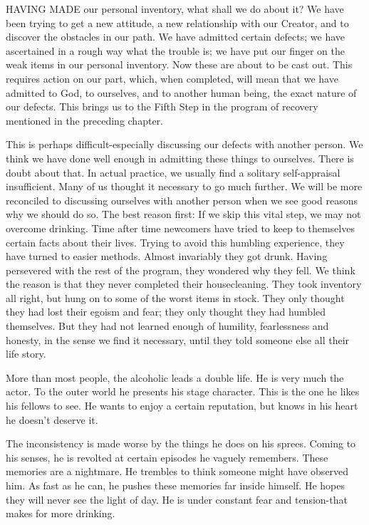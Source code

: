 
\bbChapterPreamble


\begin{biblechapter}
    HAVING MADE our personal inventory, what shall we do about it?  We have been trying to get a new attitude, a new relationship with our Creator, and to discover the obstacles in our path.  We have admitted certain defects; we have ascertained in a rough way what the trouble is; we have put our finger on the weak items in our personal inventory.  Now these are about to be cast out.  This requires action on our part, which, when completed, will mean that we have admitted to God, to ourselves, and to another human being, the exact nature of our defects.  This brings us to the Fifth Step in the program of recovery mentioned in the preceding chapter.

This is perhaps difficult-especially discussing our defects with another person.  We think we have done well enough in admitting these things to ourselves.  There is doubt about that.  In actual practice, we usually find a solitary self-appraisal insufficient.  Many of us thought it necessary to go much further.  We will be more reconciled to discussing ourselves with another person when we see good reasons why we should do so.  The best reason first: If we skip this vital step, we may not overcome drinking.  Time after time newcomers have tried to keep to themselves certain facts about their lives.  Trying to avoid this humbling experience, they have turned to easier methods.  Almost invariably they got drunk.  Having persevered with the rest of the program, they wondered why they fell.  We think the reason is that they never completed their housecleaning.  They took inventory all right, but hung on to some of the worst items in stock.  They only thought they had lost their egoism and fear; they only thought they had humbled themselves.  But they had not learned enough of humility, fearlessness and honesty, in the sense we find it necessary, until they told someone else all their life story.

More than most people, the alcoholic leads a double life.  He is very much the actor.  To the outer world he presents his stage character.  This is the one he likes his fellows to see.  He wants to enjoy a certain reputation, but knows in his heart he doesn't deserve it.

The inconsistency is made worse by the things he does on his sprees.  Coming to his senses, he is revolted at certain episodes he vaguely remembers.  These memories are a nightmare.  He trembles to think someone might have observed him.  As fast as he can, he pushes these memories far inside himself.  He hopes they will never see the light of day.  He is under constant fear and tension-that makes for more drinking.


\end{biblechapter}

